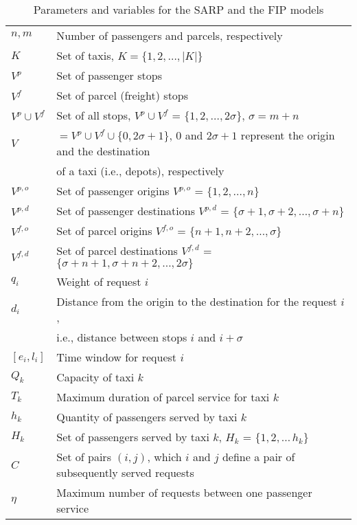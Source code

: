 \documentclass[preprint,authoryear,12pt]{elsarticle}
\begin{document}

\begin{table*}
\caption{Parameters and variables for the SARP and the FIP models}
\small
\begin{tabular}{ll}
\hline
$n,m$ & Number of passengers and parcels, respectively\\
$K$   & Set of taxis, $K=\{1,2,\ldots,|K|\}$\\
$V^p$ & Set of passenger stops\\
$V^f$ & Set of parcel (freight) stops\\
$V^p\cup V^f$ & Set of all stops, $V^p\cup V^f$ = $\{1,2,\ldots,2\sigma\}$, $\sigma=m+n$\\
$V$ & $=V^p\cup V^f \cup \{0,2\sigma+1\}$, $0$ and $2\sigma+1$ represent the origin and the destination\\
& of a taxi (i.e., depots), respectively\\
$V^{p,o}$ & Set of passenger origins $V^{p,o}$ = $\{1,2,\ldots,n\}$\\
$V^{p,d}$ & Set of passenger destinations $V^{p,d}$ = $\{\sigma+1,\sigma+2,\ldots,\sigma+n\}$ \\
$V^{f,o}$ & Set of parcel origins $V^{f,o}$ = $\{n+1,n+2, \dots, \sigma\}$\\
$V^{f,d}$ & Set of parcel destinations $V^{f,d}$ = $\{\sigma+n+1,\sigma+n+2,\ldots,2\sigma\}$\\
$q_i$ & Weight of request $i$\\
$d_i$ & Distance from the origin to the destination for the request $i$, \\
      & i.e., distance between stops $i$ and $i+\sigma$\\
$[e_i, l_i]$& Time window for request $i$\\
$Q_{k}$ & Capacity of taxi $k$\\
$T_k$ & Maximum duration of parcel service for taxi $k$\\
$h_k$ &Quantity of passengers served by taxi $k$\\
$H_k$ & Set of passengers served by taxi $k$, $H_k$ = $\{1,2,\ldots\,h_k\}$\\
$C$ & Set of pairs $(i,j)$, which $i$ and $j$ define a pair of subsequently served requests \\
$\eta$ & Maximum number of requests between one passenger service\\

\end{tabular}
\end{table*}
\end{document}

